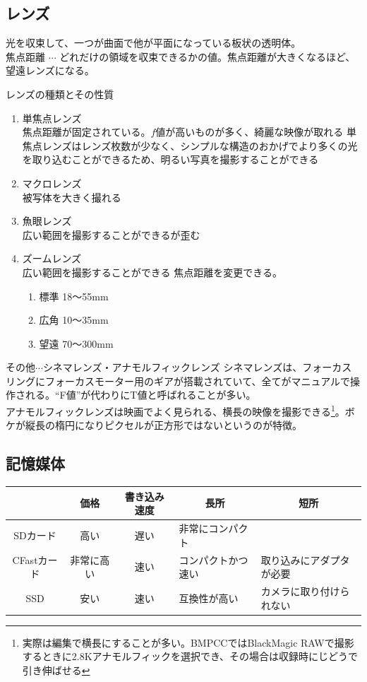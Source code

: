 \documentclass[a4paper]{ltjsreport}
\begin{document}
\subsection{レンズ}
光を収束して、一つが曲面で他が平面になっている板状の透明体。\\
焦点距離 $\cdots$ どれだけの領域を収束できるかの値。焦点距離が大きくなるほど、望遠レンズになる。
\begin{itembox}[l]{レンズの種類とその性質}
  \begin{enumerate}
    \item 単焦点レンズ\\
          焦点距離が固定されている。$f値$が高いものが多く、綺麗な映像が取れる
          単焦点レンズはレンズ枚数が少なく、シンプルな構造のおかげでより多くの光を取り込むことができるため、明るい写真を撮影することができる
    \item マクロレンズ\\被写体を大きく撮れる
    \item 魚眼レンズ\\広い範囲を撮影することができるが歪む
    \item ズームレンズ\\広い範囲を撮影することができる
          焦点距離を変更できる。
          \begin{enumerate}
            \item 標準 18〜55mm
            \item 広角 10〜35mm
            \item 望遠 70〜300mm
          \end{enumerate}
  \end{enumerate}
  その他$\cdots$シネマレンズ・アナモルフィックレンズ
  シネマレンズは、フォーカスリングにフォーカスモーター用のギアが搭載されていて、全てがマニュアルで操作される。``F値''が代わりにT値と呼ばれることが多い。\\
  アナモルフィックレンズは映画でよく見られる、横長の映像を撮影できる\footnote{実際は編集で横長にすることが多い。BMPCCではBlackMagic RAWで撮影するときに2.8Kアナモルフィックを選択でき、その場合は収録時にじどうで引き伸ばせる}。ボケが縦長の楕円になりピクセルが正方形ではないというのが特徴。
\end{itembox}
\subsection{記憶媒体}
\begin{table}[h]
  \begin{tabular}{|c||c|c|l|l|} \hline
             & 価格    & 書き込み速度 & \multicolumn{1}{|c|}{長所} & \multicolumn{1}{|c|}{短所} \\ \hline\hline
    SDカード    & 高い    & 遅い     & 非常にコンパクト                 &                          \\ \hline
    CFastカード & 非常に高い & 速い     & コンパクトかつ速い                & 取り込みにアダプタが必要             \\ \hline
    SSD      & 安い    & 速い     & 互換性が高い                   & カメラに取り付けられない             \\ \hline
  \end{tabular}
\end{table}
\end{document}
